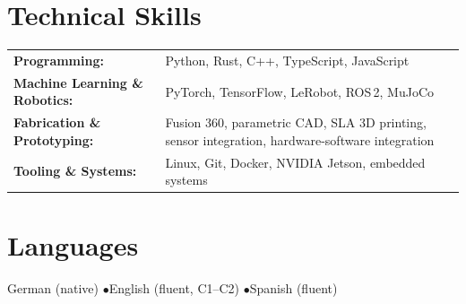 \documentclass[11pt,a4paper]{article}
\begin{document}
\section*{Technical Skills}

\begin{tabularx}{\textwidth}{@{}lX@{}}
\textbf{Programming:} & Python, Rust, C++, TypeScript, JavaScript \\[0.15em]
\textbf{Machine Learning \& Robotics:} & PyTorch, TensorFlow, LeRobot, ROS\,2, MuJoCo \\[0.15em]
\textbf{Fabrication \& Prototyping:} & Fusion 360, parametric CAD, SLA 3D printing, sensor integration, hardware-software integration \\[0.15em]
\textbf{Tooling \& Systems:} & Linux, Git, Docker, NVIDIA Jetson, embedded systems \\
\end{tabularx}

\section*{Languages}

German (native) \enspace$\bullet$\enspace English (fluent, C1--C2) \enspace$\bullet$\enspace Spanish (fluent)
\end{document}
